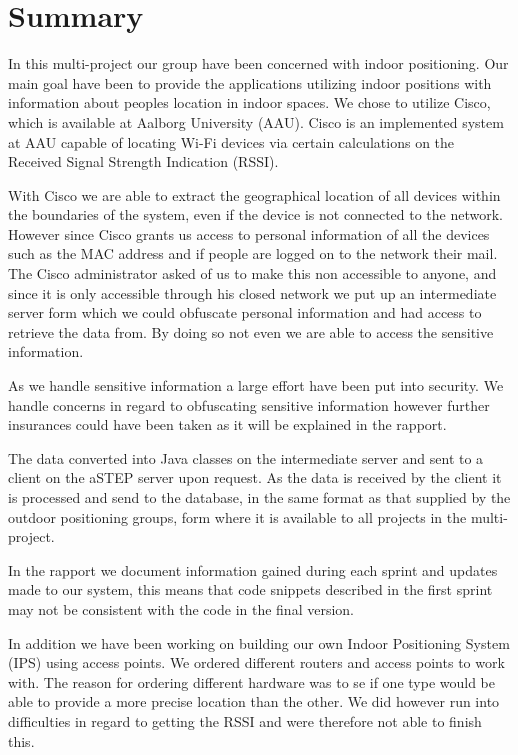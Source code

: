 \chapter*{Summary}
In this multi-project our group have been concerned with indoor positioning. Our main goal have been to provide the applications utilizing indoor positions with information about peoples location in indoor spaces. We chose to utilize Cisco, which is available at Aalborg University (AAU). Cisco is an implemented system at AAU capable of locating Wi-Fi devices via certain calculations on the Received Signal Strength Indication (RSSI).

With Cisco we are able to extract the geographical location of all devices within the boundaries of the system, even if the device is not connected to the network. However since Cisco grants us access to personal information of all the devices such as the MAC address and if people are logged on to the network their mail. The Cisco administrator asked of us to make this non accessible to anyone, and since it is only accessible through his closed network we put up an intermediate server form which we could obfuscate personal information and had access to retrieve the data from. By doing so not even we are able to access the sensitive information. 

As we handle sensitive information a large effort have been put into security. We handle concerns in regard to obfuscating sensitive information however further insurances could have been taken as it will be explained in the rapport.

The data converted into Java classes on the intermediate server and sent to a client on the aSTEP server upon request. As the data is received by the client it is processed and send to the database, in the same format as that supplied by the outdoor positioning groups, form where it is available to all projects in the multi-project.

In the rapport we document information gained during each sprint and updates made to our system, this means that code snippets described in the first sprint may not be consistent with the code in the final version.

In addition we have been working on building our own Indoor Positioning System (IPS) using access points. We ordered different routers and access points to work with. The reason for ordering different hardware was to se if one type would be able to provide a more precise location than the other. We did however run into difficulties in regard to getting the RSSI and were therefore not able to finish this.

